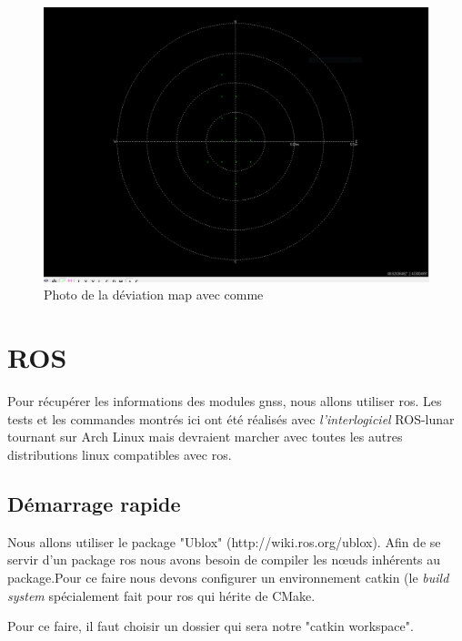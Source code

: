 \begin{figure}[!htbp]
    \centering
	\includegraphics[width=\textwidth]{img/deviation.PNG}
    \caption{Photo de la déviation map avec comme }
\end{figure}









\chapter{ROS}

Pour récupérer les informations des modules \gls{gnss}, nous allons utiliser \acrfull{ros}. Les tests et les commandes montrés ici ont été réalisés avec \textit{l'interlogiciel} ROS-lunar tournant sur Arch Linux mais devraient marcher avec toutes les autres distributions linux compatibles avec \gls{ros}.

\section{Démarrage rapide}

Nous allons utiliser le package "Ublox" (http://wiki.ros.org/ublox). Afin de se servir d'un package \gls{ros} nous avons besoin de compiler les nœuds inhérents au package.Pour ce faire nous devons configurer un environnement catkin (le \textit{build system} spécialement fait pour \gls{ros} qui hérite de CMake.

Pour ce faire, il faut choisir un dossier qui sera notre "catkin workspace".

